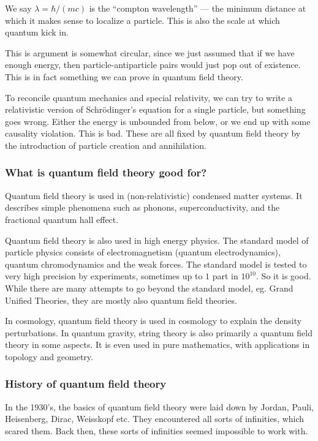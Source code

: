 \documentclass[a4paper]{article}
\begin{document}
We say $\lambda = \hbar/(mc)$ is the ``compton wavelength'' --- the minimum distance at which it makes sense to localize a particle. This is also the scale at which quantum kick in.

This is argument is somewhat circular, since we just assumed that if we have enough energy, then particle-antiparticle pairs would just pop out of existence. This is in fact something we can prove in quantum field theory.

To reconcile quantum mechanics and special relativity, we can try to write a relativistic version of Schr\"odinger's equation for a single particle, but something goes wrong. Either the energy is unbounded from below, or we end up with some causality violation. This is bad. These are all fixed by quantum field theory by the introduction of particle creation and annihilation.

\subsubsection*{What is quantum field theory good for?}
Quantum field theory is used in (non-relativistic) condensed matter systems. It describes simple phenomena such as phonons, superconductivity, and the fractional quantum hall effect.

Quantum field theory is also used in high energy physics. The standard model of particle physics consists of electromagnetism (quantum electrodynamics), quantum chromodynamics and the weak forces. The standard model is tested to very high precision by experiments, sometimes up to $1$ part in $10^{10}$. So it is good. While there are many attempts to go beyond the standard model, eg. Grand Unified Theories, they are mostly also quantum field theories.

In cosmology, quantum field theory is used in cosmology to explain the density perturbations. In quantum gravity, string theory is also primarily a quantum field theory in some aspects. It is even used in pure mathematics, with applications in topology and geometry.

\subsubsection*{History of quantum field theory}
In the 1930's, the basics of quantum field theory were laid down by Jordan, Pauli, Heisenberg, Dirac, Weisskopf etc. They encountered all sorts of infinities, which scared them. Back then, these sorts of infinities seemed impossible to work with.
\end{document}
